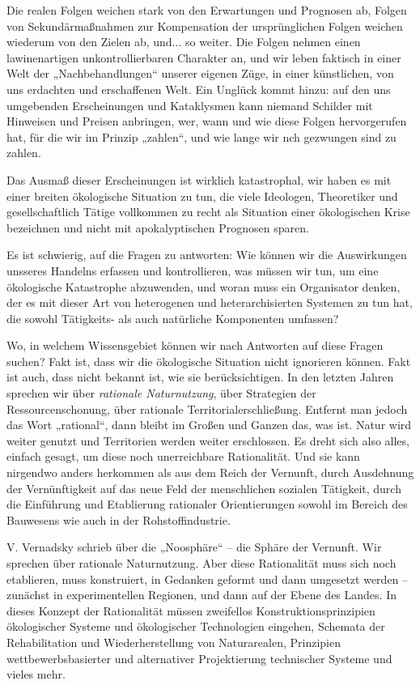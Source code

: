 \documentclass[11pt,a4paper]{article}
\begin{document}
Die realen Folgen weichen stark von den Erwartungen und Prognosen ab, Folgen
von Sekundärmaßnahmen zur Kompensation der ursprünglichen Folgen weichen
wiederum von den Zielen ab, und... so weiter. Die Folgen nehmen einen
lawinenartigen unkontrollierbaren Charakter an, und wir leben faktisch in
einer Welt der „Nachbehandlungen“ unserer eigenen Züge, in einer künstlichen,
von uns erdachten und erschaffenen Welt. Ein Unglück kommt hinzu: auf den uns
umgebenden Erscheinungen und Kataklysmen kann niemand Schilder mit Hinweisen
und Preisen anbringen, wer, wann und wie diese Folgen hervorgerufen hat, für
die wir im Prinzip „zahlen“, und wie lange wir nch gezwungen  sind zu zahlen.  

Das Ausmaß dieser Erscheinungen ist wirklich katastrophal, wir haben es mit
einer breiten ökologische Situation zu tun, die viele Ideologen, Theoretiker
und gesellschaftlich Tätige vollkommen zu recht als Situation einer
ökologischen Krise bezeichnen und nicht mit apokalyptischen Prognosen sparen.

Es ist schwierig, auf die Fragen zu antworten: Wie können wir die Auswirkungen
unsseres Handelns erfassen und kontrollieren, was müssen wir tun, um eine
ökologische Katastrophe abzuwenden, und woran muss ein Organisator denken, der
es mit dieser Art von heterogenen und heterarchisierten Systemen zu tun hat,
die sowohl Tätigkeits- als auch natürliche Komponenten umfassen?

Wo, in welchem Wissensgebiet können wir nach Antworten auf diese Fragen
suchen? Fakt ist, dass wir die ökologische Situation nicht ignorieren können.
Fakt ist auch, dass nicht bekannt ist, wie sie berücksichtigen. In den letzten
Jahren sprechen wir über \emph{rationale Naturnutzung}, über Strategien der
Ressourcenschonung, über rationale Territorialerschließung. Entfernt man
jedoch das Wort „rational“, dann bleibt im Großen und Ganzen das, was ist.
Natur wird weiter genutzt und Territorien werden weiter erschlossen. Es dreht
sich also alles, einfach gesagt, um diese noch unerreichbare Rationalität.
Und sie kann nirgendwo anders herkommen als aus dem Reich der Vernunft, durch
Ausdehnung der Vernünftigkeit auf das neue Feld der menschlichen sozialen
Tätigkeit, durch die Einführung und Etablierung rationaler Orientierungen
sowohl im Bereich des Bauwesens wie auch in der Rohstoffindustrie.

V. Vernadsky schrieb über die „Noosphäre“ -- die Sphäre der Vernunft. Wir
sprechen über rationale Naturnutzung. Aber diese Rationalität muss sich noch
etablieren, muss konstruiert, in Gedanken geformt und dann umgesetzt werden --
zunächst in experimentellen Regionen, und dann auf der Ebene des Landes.  In
dieses Konzept der Rationalität müssen zweifellos Konstruktionsprinzipien
ökologischer Systeme und ökologischer Technologien eingehen, Schemata der
Rehabilitation und Wiederherstellung von Naturarealen, Prinzipien
wettbewerbsbasierter und alternativer Projektierung technischer Systeme und
vieles mehr.
\end{document}
